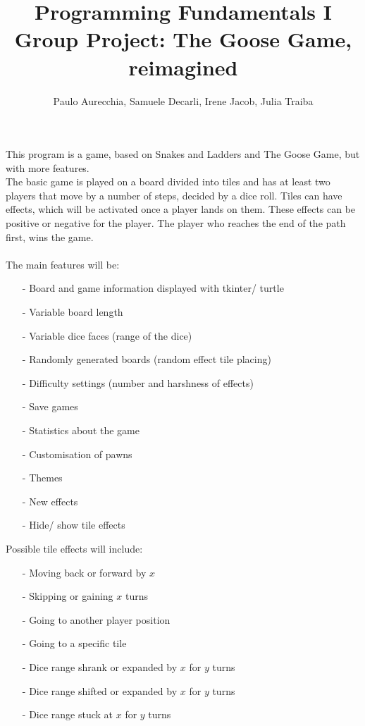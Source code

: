 \documentclass[12pt]{article}
\title{Programming Fundamentals I\\ {\bf Group Project: The Goose Game, reimagined}}
\author{Paulo Aurecchia, Samuele Decarli, Irene Jacob, Julia Traiba}
\date{}
\begin{document}
\maketitle
\thispagestyle{fancy}
\noindent This program is a game, based on Snakes and Ladders and The Goose Game, but with more features.\\
The basic game is played on a board divided into tiles and has at least two players that move by a number of steps, decided by a dice roll. Tiles can have effects, which will be activated once a player lands on them. These effects can be positive or negative for the player. The player who reaches the end of the path first, wins the game.\\
\\
The main features will be:
\begin{itemize}
	\item [-] Board and game information displayed with tkinter/ turtle
	\item [-] Variable board length
	\item [-] Variable dice faces (range of the dice)
	\item [-] Randomly generated boards (random effect tile placing)
	\item [-] Difficulty settings (number and harshness of effects)
	\item [-] Save games
	\item [-] Statistics about the game
	\item [-] Customisation of pawns
	\item [-] Themes
	\item [-] New effects
	\item [-] Hide/ show tile effects\\
\end{itemize}
Possible tile effects will include:
\begin{itemize}
	\item [-] Moving back or forward by $x$
	\item [-] Skipping or gaining $x$ turns
	\item [-] Going to another player position
	\item [-] Going to a specific tile
	\item [-] Dice range shrank or expanded by $x$ for $y$ turns
	\item [-] Dice range shifted or expanded by $x$ for $y$ turns
	\item [-] Dice range stuck at $x$ for $y$ turns
\end{itemize}
\end{document}
